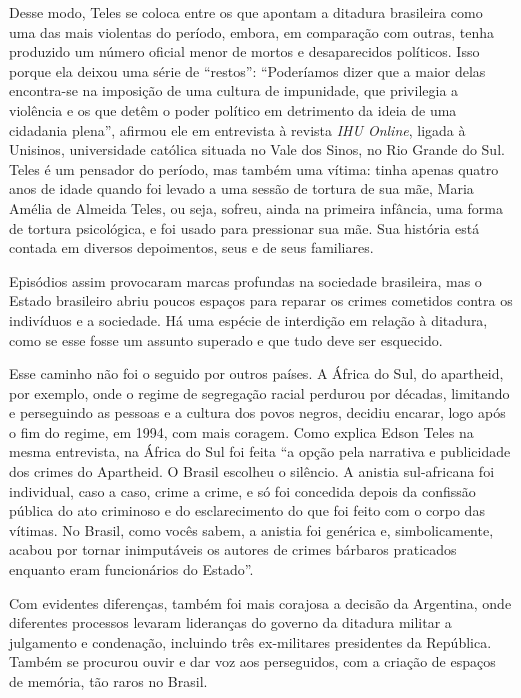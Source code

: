 \documentclass[12pt]{extarticle}
\begin{document}
Desse modo, Teles se coloca entre os que apontam a ditadura brasileira
como uma das mais violentas do período, embora, em comparação com
outras, tenha produzido um número oficial menor de mortos e
desaparecidos políticos. Isso porque ela deixou uma série de ``restos'':
``Poderíamos dizer que a maior delas encontra-se na imposição de uma
cultura de impunidade, que privilegia a violência e os que detêm o poder
político em detrimento da ideia de uma cidadania plena'', afirmou ele em
entrevista à revista \emph{IHU Online}, ligada à Unisinos, universidade
católica situada no Vale dos Sinos, no Rio Grande do Sul. Teles é um
pensador do período, mas também uma vítima: tinha apenas quatro anos de
idade quando foi levado a uma sessão de tortura de sua mãe, Maria Amélia
de Almeida Teles, ou seja, sofreu, ainda na primeira infância, uma forma
de tortura psicológica, e foi usado para pressionar sua mãe.
Sua história está contada em diversos depoimentos, seus e de seus
familiares.



Episódios assim provocaram marcas profundas na sociedade brasileira, mas
o Estado brasileiro abriu poucos espaços para reparar os crimes cometidos contra os 
indivíduos e a sociedade. Há uma espécie de
interdição em relação à ditadura, como se esse fosse um assunto superado
e que tudo deve ser esquecido.

Esse caminho não foi o seguido por outros países. A África do Sul, do
apartheid, por exemplo, onde o regime de segregação racial perdurou por
décadas, limitando e perseguindo as pessoas e a cultura dos povos
negros, decidiu encarar, logo após o fim do regime, em 1994, com mais
coragem. Como explica Edson Teles na mesma entrevista, na África do Sul
foi feita ``a opção pela narrativa e publicidade dos crimes do
Apartheid. O Brasil escolheu o silêncio. A anistia sul-africana foi
individual, caso a caso, crime a crime, e só foi concedida depois da
confissão pública do ato criminoso e do esclarecimento do que foi feito
com o corpo das vítimas. No Brasil, como vocês sabem, a anistia foi
genérica e, simbolicamente, acabou por tornar inimputáveis os autores de
crimes bárbaros praticados enquanto eram funcionários do Estado''.

Com evidentes diferenças, também foi mais corajosa a decisão da Argentina, onde
diferentes processos levaram lideranças do governo da ditadura militar a
julgamento e condenação, incluindo três ex-militares presidentes da República. Também
se procurou ouvir e dar voz aos perseguidos, com a criação de espaços de
memória, tão raros no Brasil.
\end{document}
